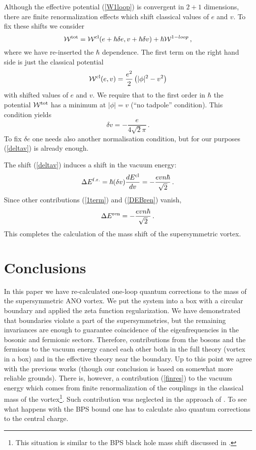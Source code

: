 \documentclass[a4paper,12pt]{article}
\begin{document}
Although the effective potential (\ref{W1loop}) is convergent
in $2+1$ dimensions, there are finite renormalization effects
which shift classical values of $e$ and $v$. To fix these shifts
we consider
\begin{equation}
{\cal W}^{\rm tot}={\cal W}^{\rm cl}(e+\hbar \delta e,v +\hbar\delta v)
+\hbar {\cal W}^{1-loop} \,,\label{Wtot} 
\end{equation}
where we have re-inserted the $\hbar$ dependence. The first term
on the right hand side is just the classical potential 
\begin{equation}
{\cal W}^{\rm cl}(e,v)=\frac{e^2}2 \left( |\phi |^2 -v^2 \right) 
\label{Wclass}
\end{equation}
with shifted values of $e$ and $v$. We require that to the first
order in $\hbar$ the potential ${\cal W}^{\rm tot}$ has a minimum
at $|\phi |=v$ (``no tadpole'' condition). This condition yields
\begin{equation}
\delta v = -\frac{e}{4\sqrt{2}\pi}\,.\label{deltav}
\end{equation}
To fix $\delta e$ one needs also another normalisation condition,
but for our purposes (\ref{deltav}) is already enough.

The shift (\ref{deltav}) induces a shift in the vacuum energy:
\begin{equation}
\Delta E^{\rm f.r.}=\hbar (\delta v)\frac{dE^{\rm cl}}{dv}=
-\frac{evn\hbar}{\sqrt{2}} \,.\label{DEfr}
\end{equation}
Since other contributions (\ref{1term}) and (\ref{DEBren}) vanish,
\begin{equation}
\Delta E^{\rm ren}=-\frac{evn\hbar}{\sqrt{2}} \,.\label{finres}
\end{equation}
This completes the calculation of the mass shift of the supersymmetric
vortex.
\section{Conclusions}\label{conclu}
In this paper we have re-calculated one-loop quantum corrections
to the mass of the supersymmetric ANO vortex. We put the system
into a box with a circular boundary and applied the zeta function
regularization. We have demonstrated that boundaries violate
a part of the supersymmetries, but the remaining invariances are
enough to guarantee coincidence of the eigenfrequencies in the
bosonic and fermionic sectors. Therefore, contributions from
the bosons and the fermions to the vacuum energy cancel each 
other both in the full theory (vortex in a box) and in the 
effective theory near the boundary. Up to this point we agree with
the previous works \cite{Schmidt:cu,Lee:1994pm} (though our
conclusion is based on somewhat more reliable grounds). There is,
however,  a contribution (\ref{finres}) to the vacuum energy which comes from
finite renormalization of the couplings in the classical mass
of the vortex\footnote{This situation is similar to the BPS
black hole mass shift discussed in \cite{Rey:1996sm}.}. 
Such contribution was neglected in the approach
of \cite{Schmidt:cu,Lee:1994pm}. To see what happens with the BPS
bound one has to calculate also quantum corrections to the central
charge.
\end{document}
